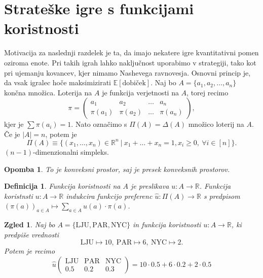 \documentclass[10pt, a4paper]{article}
\newtheorem{defi}[izr]{Definicija}
\newenvironment{noticeB}{%
  \tcolorbox[%
  notitle,
  empty,
  enhanced,  %
  breakable,
  coltext=black,
  colback=white, 
  fontupper=\rmfamily,
  parbox=false,
  noparskip,
  sharp corners,
  boxrule=-1pt,  %
  frame hidden,
  left=7pt,  %
  right=7pt,
  top=5pt,
  bottom=5pt,
  before skip=2.5ex plus 2pt,
  after skip=2.5ex plus 2pt,
  borderline west = {1.5pt}{-0.1pt}{blue!30!black}, %
  overlay unbroken and last={%
    \draw[color=black, line width=1.25pt]
    ($(frame.south west)+(1.pt, -0.1pt)$) -- ++(2em, 0);
  }
  ]}
{\endtcolorbox}
\newenvironment{definicija}{\begin{defi}\begin{noticeB}}{%
    \end{noticeB}\end{defi}}
\newtheorem*{opomba}{Opomba}
\newtheorem{zgled}[izr]{Zgled}
\newcommand{\R}{\mathbb {R}}
\begin{document}
\section{Strateške igre s funkcijami koristnosti}

Motivacija za naslednji razdelek je ta, da imajo nekatere igre kvantitativni pomen oziroma enote.
Pri takih igrah lahko naključnost uporabimo v strategiji, tako kot pri ujemanju kovancev, kjer nimamo Nashevega ravnovesja.
Osnovni princip je, da vsak igralec hoče maksimizirati $\mathbb{E} [\text{dobiček}]$.
Naj bo $A = \{a_1, a_2, \dots, a_n\}$ končna množica. Loterija na $A$ je funkcija verjetnosti na $A$, torej recimo 
$$\pi = \begin{pmatrix}
  a_1 & a_2 & \dots & a_n\\
  \pi (a_1) & \pi (a_2) & \dots & \pi (a_n)
\end{pmatrix},$$
kjer je $\sum \pi (a_i) = 1$. Nato označimo s $\Pi (A) = \Delta(A)$ množico loterij na $A$.
Če je $|A| = n$, potem je $$\Pi(A) \equiv \{(x_1, \dots, x_n) \in \R^n\ |\ x_1 + \dots + x_n = 1, x_i \geq 0,\ \forall i \in [n]\}.$$
$(n - 1)$-dimenzionalni simpleks.

\begin{opomba}
  To je konveksni prostor, saj je presek konveksnih prostorov.
\end{opomba}

\begin{definicija}
  Funkcija koristnosti na $A$ je preslikava $u: A \to \R$.
  Funkcija koristnsti $u: A \to \R$ indukcira funkcijo preferenc $\hat{u} : \Pi(A) \to \R$
  s predpisom $(\pi(a))_{a \in A} \mapsto \sum_{a \in A} u(a) \cdot \pi (a)$.
\end{definicija}

\begin{zgled}
  Naj bo $A = \{\mathrm{LJU}, \mathrm{PAR}, \mathrm{NYC}\}$ in funkcija koristnosti 
  $u: A \to \R$, ki predpiše vrednosti
  $$\mathrm{LJU} \mapsto 10,\ \mathrm{PAR} \mapsto 6,\ \mathrm{NYC} \mapsto 2.$$
  Potem je recimo 
  $$\hat{u} \begin{pmatrix}
    \mathrm{LJU} & \mathrm{PAR} & \mathrm{NYC}\\
    0.5 & 0.2 & 0.3
  \end{pmatrix} = 10 \cdot 0.5 + 6 \cdot 0.2 + 2 \cdot  0.5$$
\end{zgled}
\end{document}
